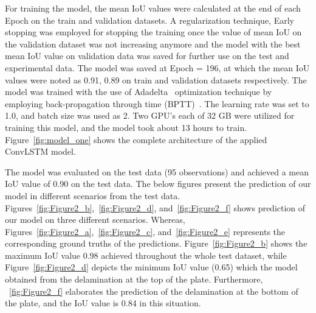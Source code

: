 For training the model, the mean IoU values were calculated at the end of each Epoch on the train and validation datasets.
A regularization technique, Early stopping was employed for stopping the training once the value of mean IoU on the validation dataset was not increasing anymore and the model with the best mean IoU value on validation data was saved for further use on the test and experimental data.
The model was saved at Epoch = 196, at which the mean IoU values were noted as 0.91, 0.89 on train and validation datasets respectively.
The model was trained with the use of Adadelta~\cite{zeiler2012adadelta} optimization technique by employing back-propagation through time (BPTT)~\cite{goodfellow2016deep}. 
The learning rate was set to 1.0, and batch size was used as 2.
Two GPU's each of 32 GB were utilized for training this model, and the model took about 13 hours to train. 
Figure~\ref{fig:model_one} shows the complete architecture of the applied ConvLSTM model.


The model was evaluated on the test data (95 observations) and achieved a mean IoU value of 0.90 on the test data.
The below figures present the prediction of our model in different scenarios from the test data.
Figures~\ref{fig:Figure2_b},~\ref{fig:Figure2_d}, and~\ref{fig:Figure2_f} shows prediction of our model on three different scenarios.
Whereas, Figures~\ref{fig:Figure2_a},~\ref{fig:Figure2_c}, and~\ref{fig:Figure2_e} represents the corresponding ground truths of the predictions.
Figure~\ref{fig:Figure2_b} shows the maximum IoU value 0.98 achieved throughout the whole test dataset, while Figure~\ref{fig:Figure2_d} depicts the minimum IoU value (0.65) which the model obtained from the delamination at the top of the plate.
Furthermore, ~\ref{fig:Figure2_f} elaborates the prediction of the delamination at the bottom of the plate, and the IoU value is 0.84 in this situation.

